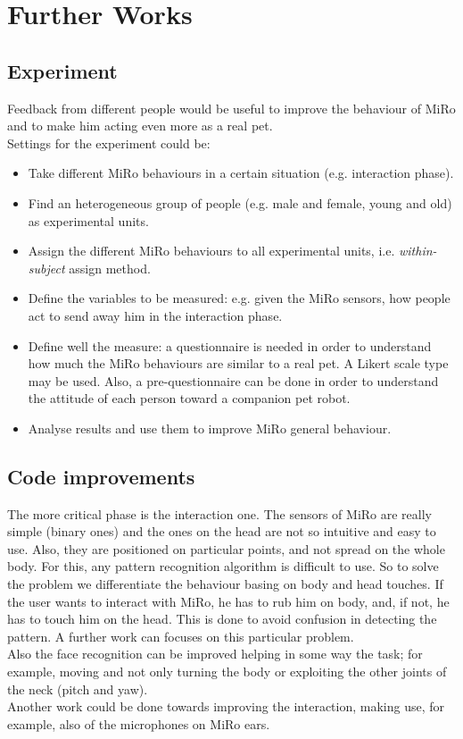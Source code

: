 \documentclass[12pt,peerreviewca, a4paper, onecolumn]{article}
\begin{document}
	\section{Further Works}
	\subsection{Experiment}
	Feedback from different people would be useful to improve the behaviour of MiRo and to make him acting even more as a real pet.\\
	Settings for the experiment could be:
	\begin{itemize}
		\item Take different MiRo behaviours in a certain situation (e.g. interaction phase).
		\vspace{-6px}
		\item Find an heterogeneous group of people (e.g. male and female, young and old) as experimental units.
		\vspace{-6px}
		\item Assign the different MiRo behaviours to all experimental units, i.e. \textit{within-subject} assign method.
		\vspace{-18px}
		\item Define the variables to be measured: e.g. given the MiRo sensors, how people act to send away him in the interaction phase.
		\vspace{-6px}
		\item Define well the measure: a questionnaire is needed in order to understand how much the MiRo behaviours are similar to a real pet. A Likert scale type may be used. Also, a pre-questionnaire can be done in order to understand the attitude of each person toward a companion pet robot.
		\vspace{-6px}
		\item Analyse results and use them to improve MiRo general behaviour.
	\end{itemize}
	
	
	
	\subsection{Code improvements}
	The more critical phase is the interaction one. The sensors of MiRo are really simple (binary ones) and the ones on the head are not so intuitive and easy to use. Also, they are positioned on particular points, and not spread on the whole body. For this, any pattern recognition algorithm is difficult to use. So to solve the problem we differentiate the behaviour basing on body and head touches. If the user wants to interact with MiRo, he has to rub him on body, and, if not, he has to touch him on the head. This is done to avoid confusion in detecting the pattern. A further work can focuses on this particular problem.\\
	Also the face recognition can be improved helping in some way the task; for example, moving and not only turning the body or exploiting the other joints of the neck (pitch and yaw).\\
	Another work could be done towards improving the interaction, making use, for example, also of the microphones on MiRo ears.
 
	 
		

	
\end{document}
